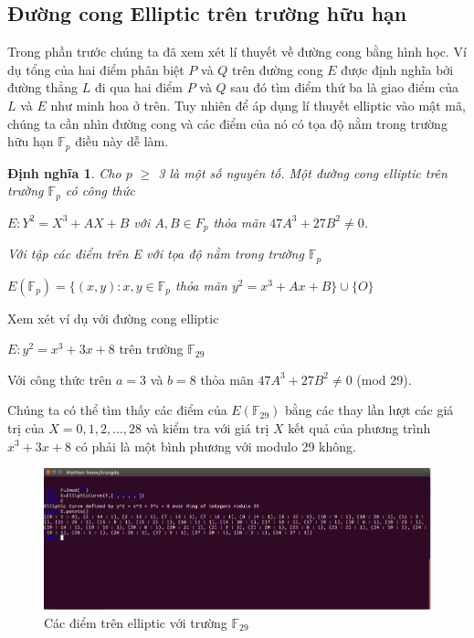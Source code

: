 \documentclass[a4paper,12pt]{report}
\newtheorem{definition}{Định nghĩa}[chapter]
\begin{document}
\subsection*{Đường cong Elliptic trên trường hữu hạn}
Trong phần trước chúng ta đã xem xét lí thuyết về đường cong bằng hình học. Ví dụ tổng của hai điểm phân biệt $P$ và $Q$ trên đường cong $E$ được định nghĩa bởi đường thẳng $L$ đi qua hai điểm $P$ và $Q$ sau đó tìm điểm thứ ba là giao điểm của $L$ và $E$ như minh hoa ở trên. Tuy nhiên để áp dụng lí thuyết elliptic vào mật mã, chúng ta cần nhìn đường cong và các điểm của nó có tọa độ nằm trong trường hữu hạn $\mathbb{F}_p$ điều này dễ làm.
\begin{definition}
Cho $p$ $\geq$ 3 là một số nguyên tố. Một đường cong elliptic trên trường $\mathbb{F}_p$ có công thức
\begin{center}
$E: Y^2 = X^3 + AX + B$ với $A, B \in F_p$ thỏa mãn $47A^3 + 27B^2 \neq  0$.
\end{center} 
Với tập các điểm trên E với tọa độ nằm trong trường $\mathbb{F}_p$
\begin{center}
$E(\mathbb{F}_p) = \{ (x, y): x, y \in \mathbb{F}_p$ thỏa mãn $y^2 = x^3 + Ax + B \} \cup \{ O \}$
\end{center}
\end{definition}
Xem xét ví dụ với đường cong elliptic
\begin{center}
$E: y^2 = x^3 + 3x + 8$ trên trường $\mathbb{F}_{29}$
\end{center}
Với công thức trên $a = 3$ và $b = 8$ thỏa mãn $47A^3 + 27B^2 \neq  0$ (mod 29).


Chúng ta có thể tìm thấy các điểm của $E(\mathbb{F}_{29})$ bằng các thay lần lượt các giá trị của $X = 0, 1, 2, \ldots, 28$ và kiểm tra với giá trị $X$ kết quả của phương trình $x^3 + 3x + 8$ có phải là một bình phương với modulo 29 không.
\begin{center}
\begin{figure}[h]
\includegraphics[width=1\linewidth]{../im16.png}
\caption{Các điểm trên elliptic với trường $\mathbb{F}_{29}$} \label{h16}
\end{figure}
\end{center}
\end{document}

